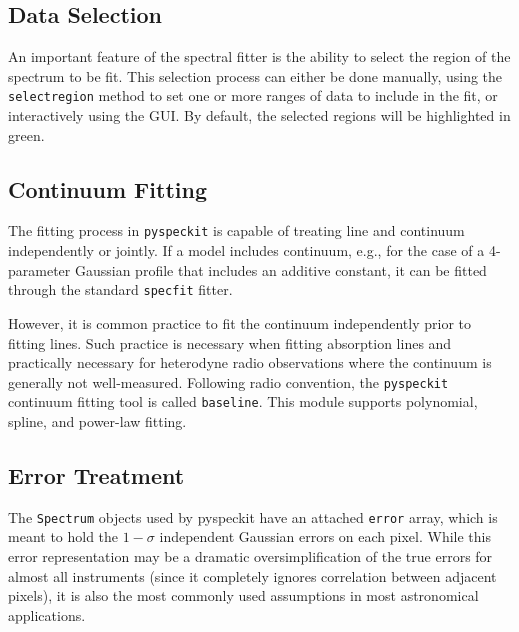 \documentclass[twocolumn]{aastex62}
\newcommand{\pyspeckit}{\texttt{pyspeckit}\xspace}
\begin{document}
\subsection{Data Selection}
An important feature of the spectral fitter is the ability to select the region
of the spectrum to be fit.  This selection process can either be done manually,
using the \texttt{selectregion} method to set one or more ranges of data to
include in the fit, or interactively using the GUI.  By default, the selected
regions will be highlighted in green.

\subsection{Continuum Fitting}
The fitting process in \pyspeckit is capable of treating line and continuum
independently or jointly.  If a model includes continuum, e.g., for the case
of a 4-parameter Gaussian profile that includes an additive constant, it
can be fitted through the standard \texttt{specfit} fitter.

However, it is common practice to fit the continuum independently prior to
fitting lines.  Such practice is necessary when fitting absorption lines
and practically necessary for heterodyne radio observations where the
continuum is generally not well-measured.  Following radio convention,
the \pyspeckit continuum fitting tool is called \texttt{baseline}.
This module supports polynomial, spline, and power-law fitting.

\subsection{Error Treatment}



The \texttt{Spectrum} objects used by pyspeckit have an attached \texttt{error}
array, which is meant to hold the $1-\sigma$ independent Gaussian errors on
each pixel.  While this error representation may be a dramatic
oversimplification of the true errors for almost all instruments (since it
completely ignores correlation between adjacent pixels), it is also the most
commonly used assumptions in most astronomical applications.
\end{document}
